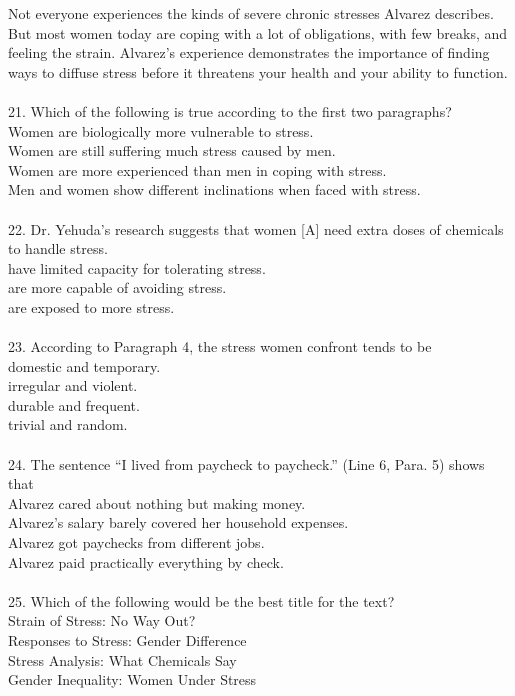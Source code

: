 \documentclass[a4paper]{ctexart}
\begin{document}
\par
Not everyone experiences the kinds of severe chronic stresses Alvarez describes. But most women today are coping with a lot of obligations, with few breaks, and feeling the strain. Alvarez’s experience demonstrates the importance of finding ways to diffuse stress before it threatens your health and your ability to function.
\\
\\
21.	Which of the following is true according to the first two paragraphs?\\
[A] Women are biologically more vulnerable to stress.\\
[B] Women are still suffering much stress caused by men.\\
[C] Women are more experienced than men in coping with stress.\\
[D] Men and women show different inclinations when faced with stress.\\
\\
22.	Dr. Yehuda’s research suggests that women
[A] need extra doses of chemicals to handle stress.\\
[B] have limited capacity for tolerating stress.\\
[C] are more capable of avoiding stress.\\
[D] are exposed to more stress.\\
\\
23.	According to Paragraph 4, the stress women confront tends to be\\
[A] domestic and temporary.\\
[B] irregular and violent.\\
[C] durable and frequent.\\
[D] trivial and random.\\
\\
24.	The sentence “I lived from paycheck to paycheck.” (Line 6, Para. 5) shows that\\
[A] Alvarez cared about nothing but making money.\\
[B] Alvarez’s salary barely covered her household expenses.\\
[C] Alvarez got paychecks from different jobs.\\
[D] Alvarez paid practically everything by check.\\
\\
25.	Which of the following would be the best title for the text?\\
[A] Strain of Stress: No Way Out?\\
[B] Responses to Stress: Gender Difference\\
[C] Stress Analysis: What Chemicals Say\\
[D] Gender Inequality: Women Under Stress\\
\end{document}
